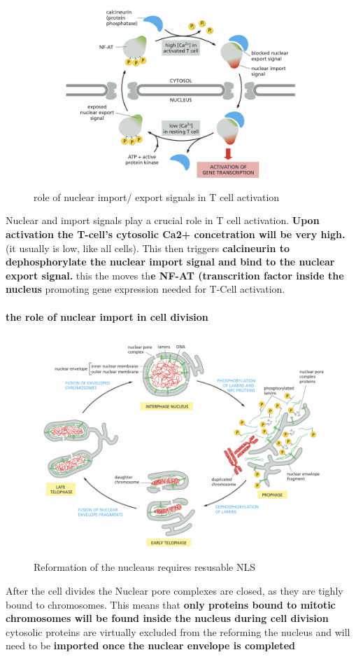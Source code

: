 \documentclass[../main.tex]{subfiles}
\begin{document}
\begin{remark}
    
\begin{figure}[H]
    \centering
    \includegraphics[width=0.7\linewidth]{TCells.png}
    \caption{role of nuclear import/ export signals in T cell activation}
    \label{fig:enter-label}
\end{figure}

Nuclear and import signals play a crucial role in T cell activation. \textbf{Upon activation the T-cell's cytosolic Ca2+ concetration will be very high.} (it usually is low, like all cells). This then triggers \textbf{\gls{calcineurin} to dephosphorylate the nuclear import signal and bind to the nuclear export signal.} this the moves th\textbf{e NF-AT (transcrition factor inside the nucleus} promoting gene expression needed for T-Cell activation.
\end{remark}



\paragraph{the role of nuclear import in cell division}
\begin{figure}[H]
    \centering
    \includegraphics[width=0.7\linewidth]{NuclearReforming.png}
    \caption{Reformation of the nucleaus requires resusable NLS}
    \label{fig:enter-label}
\end{figure}
After the cell divides the Nuclear pore complexes are closed, as they are tighly bound to chromosomes. This means that \textbf{only proteins bound to mitotic chromosomes will be found inside the nucleus during cell division} cytosolic proteins are virtually excluded from the reforming the nucleus and will need to be \textbf{imported once the nuclear envelope is completed}
\end{document}
